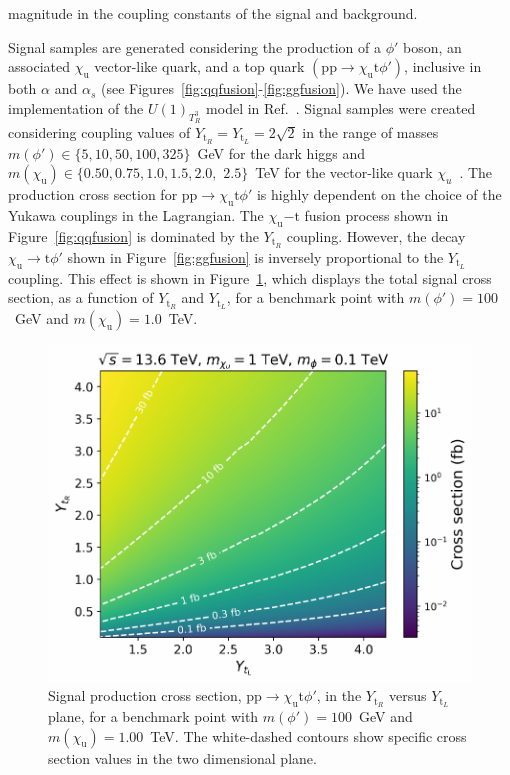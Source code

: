 magnitude in the coupling constants of the signal and background.

Signal samples are generated considering the production of a $\phi'$ boson, an associated $\chi_\mathrm{u}$ vector-like quark, and a top quark $(\mathrm{pp}\to \chi_\mathrm{u} \mathrm{t} \phi')$, inclusive in both $\alpha$ and $\alpha_s$ (see Figures~\ref{fig:qqfusion}-\ref{fig:ggfusion}). We have used the implementation of the $U(1)_{T^3_R}$ model in Ref.~\parencite{Dutta2023}. Signal samples were created considering coupling values of $Y_{\mathrm{t}_R}=Y_{\mathrm{t}_L}=2\sqrt{2}$ in the range of masses $m(\phi')\in\{5,10,50,100,325\}$~\textrm{GeV} for the dark higgs and $m(\chi_\mathrm{u})\in\{0.50, 0.75, 1.0, 1.5, 2.0, $ $ 2.5\}$~\textrm{TeV} for the vector-like quark $\chi_u$~\parencite{PhysRevD.108.095006}. The production cross section for $\mathrm{pp}\to \chi_\mathrm{u} \mathrm{t} \phi'$ is highly dependent on the choice of the Yukawa couplings in the Lagrangian. The ${\chi_\mathrm{u}}{- \mathrm{t}}$ fusion process shown in Figure~\ref{fig:qqfusion} is dominated by the $Y_{\mathrm{t}_R}$ coupling. However, the decay ${\chi_\mathrm{u}} \to \mathrm{t} \phi'$ shown in Figure~\ref{fig:ggfusion} is inversely proportional to the $Y_{\mathrm{t}_L}$ coupling. This effect is shown in Figure~\ref{fig:cross_section_by_lambdas}, which displays the total signal cross section, as a function of $Y_{\mathrm{t}_R}$ and $Y_{\mathrm{t}_L}$, for a benchmark point with $m(\phi')=100$~\textrm{GeV} and $m(\chi_\mathrm{u})=1.0$~\textrm{TeV}. 

\begin{figure}
    \centering
    \includegraphics[width=0.85\linewidth]{Images/cross_section_by_lambdas.pdf}
    \caption{Signal production cross section, $ \mathrm{pp}\to \chi_\mathrm{u} \mathrm{t} \phi'$,  in the $Y_{\mathrm{t}_R}$ versus $Y_{\mathrm{t}_L}$ plane, for a benchmark point with $m(\phi')=100$~\textrm{GeV} and $m(\chi_\mathrm{u})=1.00$~\textrm{TeV}. The white-dashed contours show specific cross section values in the two dimensional plane.}
    \label{fig:cross_section_by_lambdas}
\end{figure}


